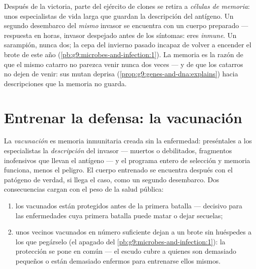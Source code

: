 \begin{definition}\label{def:g9:immune-defenses:memory}
Después de la victoria, parte del ejército de clones se retira a
\emph{células de memoria}: unos especialistas
de vida larga que guardan la descripción del antígeno. Un segundo
desembarco del \emph{mismo} invasor se encuentra con un cuerpo
preparado --- respuesta en horas, invasor despejado antes de los
síntomas: eres \emph{inmune}. Un sarampión, nunca dos;
la cepa del invierno pasado incapaz de volver a encender el brote de
este año (\cref{pb:g9:microbes-and-infection:1}). La memoria es la
razón de que el mismo catarro no parezca venir nunca dos veces --- y de
que los catarros no dejen de venir: sus  mutan deprisa
(\cref{prop:g9:genes-and-dna:explains}) hacia descripciones que la
memoria no guarda.
\end{definition}

\section{Entrenar la defensa: la vacunación}

\begin{proposition}[La vacunación]\label{prop:g9:immune-defenses:vaccination}
La \emph{vacunación} es memoria inmunitaria creada
sin la enfermedad: preséntales a los especialistas la
\emph{descripción} del invasor ---  muertos o debilitados,
fragmentos inofensivos que llevan el antígeno --- y el programa entero
de selección y memoria funciona, menos el peligro. El cuerpo entrenado
se encuentra después con el patógeno de verdad, si llega el caso, como
un segundo desembarco. Dos consecuencias cargan con el peso de la salud
pública:
\begin{enumerate}
  \item los vacunados están protegidos antes de la primera batalla ---
        decisivo para las enfermedades cuya primera batalla puede matar
        o dejar secuelas;
  \item unos vecinos vacunados en número suficiente dejan a un brote
        sin huéspedes a los que pegárselo (el apagado del
        \cref{pb:g9:microbes-and-infection:1}): la protección se pone
        en común --- el escudo cubre a quienes son demasiado pequeños o
        están demasiado enfermos para entrenarse ellos mismos.
\end{enumerate}
\end{proposition}
\admitted

